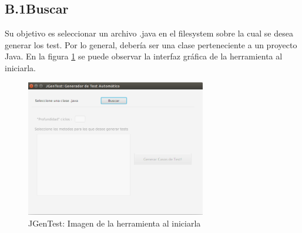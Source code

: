 \documentclass{llncs}
\begin{document}
    \subsection*{B.1\enspace Buscar}
    Su objetivo es seleccionar un archivo .java en el filesystem sobre la cual se desea generar los test. Por lo general, debería ser una clase perteneciente a un proyecto
    Java. En la figura \ref{fig:buscarClaseJava} se puede observar la interfaz gráfica de la herramienta al iniciarla.
    \begin{figure}
    \centering
    \includegraphics[width=0.7\textwidth]{screenshots/1-inicial}
    \caption{JGenTest: Imagen de la herramienta al iniciarla}
    \label{fig:buscarClaseJava}
    \end{figure}
\end{document}
